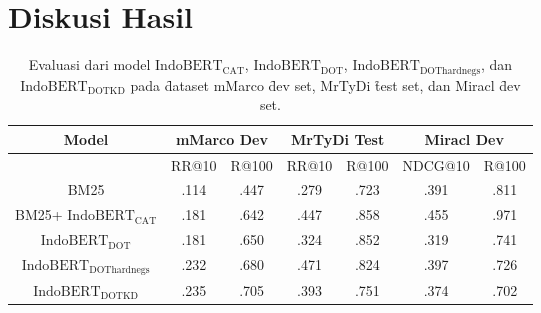\section{Diskusi Hasil}
\label{sec:diskusihasil}
\begin{table}[!ht]
    \centering
    \caption{Evaluasi dari model $\text{IndoBERT}_{\text{CAT}}$, $\text{IndoBERT}_{\text{DOT}}$, $\text{IndoBERT}_{\text{DOThardnegs}}$, dan $\text{IndoBERT}_{\text{DOTKD}}$ pada \f{dataset} mMarco \f{dev set}, MrTyDi \f{test set}, dan Miracl \f{dev set}.}
    \label{tab:evaluasisemuamodel}
    \begin{tabular}{|c|c|c|c|c|c|c|} \hline
        Model                             & \multicolumn{2}{c|}{mMarco Dev} &
        \multicolumn{2}{c|}{MrTyDi Test} & \multicolumn{2}{c|}{Miracl Dev}                                             \\ \hline
                                          & RR@10 & R@100 & RR@10 & R@100 & NDCG@10 & R@100 \\ \hline
        BM25                              & .114  & .447   & .279   & .723   & .391    & .811 \\ \hline
        BM25+ $\text{IndoBERT}_{\text{CAT}}$    & .181  & .642   & .447   & .858   & .455    & .971 \\ \hline
        $\text{IndoBERT}_{\text{DOT}}$    & .181  & .650   & .324   & .852   & .319    & .741 \\ \hline
        $\text{IndoBERT}_{\text{DOThardnegs}}$    & .232  & .680   & .471   & .824   & .397    & .726 \\ \hline
        $\text{IndoBERT}_{\text{DOTKD}}$  & .235  & .705   & .393   & .751   & .374    & .702    \\ \hline
    \end{tabular}
\end{table}


